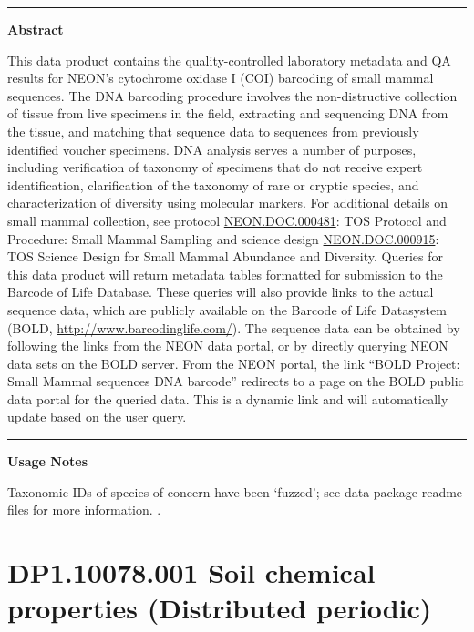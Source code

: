 \documentclass[]{article}
\begin{document}
\begin{center}\rule{0.5\linewidth}{\linethickness}\end{center}

\textbf{Abstract}

This data product contains the quality-controlled laboratory metadata
and QA results for NEON's cytochrome oxidase I (COI) barcoding of small
mammal sequences. The DNA barcoding procedure involves the
non-distructive collection of tissue from live specimens in the field,
extracting and sequencing DNA from the tissue, and matching that
sequence data to sequences from previously identified voucher specimens.
DNA analysis serves a number of purposes, including verification of
taxonomy of specimens that do not receive expert identification,
clarification of the taxonomy of rare or cryptic species, and
characterization of diversity using molecular markers. For additional
details on small mammal collection, see protocol
\href{http://data.neonscience.org/api/v0/documents/NEON.DOC.000481vJ}{NEON.DOC.000481}:
TOS Protocol and Procedure: Small Mammal Sampling and science design
\href{http://data.neonscience.org/api/v0/documents/NEON.DOC.NEON.DOC.000915vA}{NEON.DOC.000915}:
TOS Science Design for Small Mammal Abundance and Diversity. Queries for
this data product will return metadata tables formatted for submission
to the Barcode of Life Database. These queries will also provide links
to the actual sequence data, which are publicly available on the Barcode
of Life Datasystem (BOLD, \url{http://www.barcodinglife.com/}). The
sequence data can be obtained by following the links from the NEON data
portal, or by directly querying NEON data sets on the BOLD server. From
the NEON portal, the link ``BOLD Project: Small Mammal sequences DNA
barcode'' redirects to a page on the BOLD public data portal for the
queried data. This is a dynamic link and will automatically update based
on the user query.

\begin{center}\rule{0.5\linewidth}{\linethickness}\end{center}

\textbf{Usage Notes}

Taxonomic IDs of species of concern have been `fuzzed'; see data package
readme files for more information. \newpage
.

\section{DP1.10078.001 Soil chemical properties (Distributed
periodic)}\label{dp1.10078.001-soil-chemical-properties-distributed-periodic}
\end{document}
